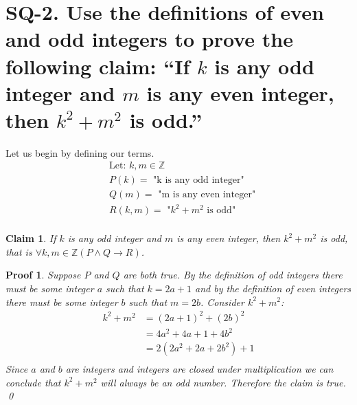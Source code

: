 \documentclass{article}
\newtheorem*{claim}{Claim}
\newtheorem*{myproof}{Proof}
\begin{document}
\section*{SQ-2. Use the definitions of even and odd integers to prove the following claim: “If $k$ is any odd integer and $m$ is any even integer, then $k^2+m^2$ is odd.” }
Let us begin by defining our terms.
\begin{align*}
    &\text{Let: } k,m\in\mathbb{Z} \\
    &P(k) = \text{ "k is any odd integer"} \\
    &Q(m) = \text{ "m is any even integer"} \\
    &R(k,m) = \text{ "$k^2 + m^2$ is odd"} \\
\end{align*}
\begin{claim}
    If $k$ is any odd integer and $m$ is any even integer, then $k^2+m^2$ is odd, that is $\forall k,m \in \mathbb{Z} (P \wedge Q \rightarrow R)$.
\end{claim}
\begin{myproof}
    Suppose $P$ and $Q$ are both true. By the definition of odd integers there must be some integer $a$ such that $k=2a+1$ and by the definition of even integers there must be some integer $b$ such that $m=2b$. Consider $k^2+m^2$:
    \begin{align*}
        k^2 + m^2 &= (2a+1)^2+(2b)^2 \\
        &= 4a^2+4a+1+4b^2 \\
        &= 2(2a^2+2a+2b^2)+1 \\
    \end{align*}
    Since $a$ and $b$ are integers and integers are closed under multiplication we can conclude that $k^2 + m^2$ will always be an odd number. Therefore the claim is true. \\ 
    \qed
\end{myproof}
\end{document}
